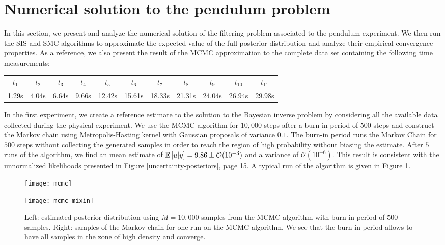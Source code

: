 \section{Numerical solution to the pendulum problem}
In this section, we present and analyze the numerical solution of the filtering problem associated to the pendulum experiment. We then run the SIS and SMC algorithms to approximate the expected value of the full posterior distribution and analyze their empirical convergence properties. As a reference, we also present the result of the MCMC approximation to the complete data set containing the following time measurements:

\begin{table}[h]
  \begin{center}
    \begin{tabular}{|c c c c c c c c c c c|}
      \hline $t_1$ & $t_2$ & $t_3$ & $t_4$ & $t_5$ & $t_6$ & $t_7$ & $t_8$ & $t_9$ & $t_{10}$ & $t_{11}$ \\
      \hline
      1.29s & 4.04s & 6.64s & 9.66s & 12.42s & 15.61s & 18.33s & 21.31s & 24.04s & 26.94s & 29.98s \\
      \hline
    \end{tabular}
  \end{center}
\end{table}

In the first experiment, we create a reference estimate to the solution to the Bayesian inverse problem by considering all the available data collected during the physical experiment. We use the MCMC algorithm for $10,000$ steps after a burn-in period of $500$ steps and construct the Markov chain using Metropolis-Hasting kernel with Gaussian proposals of variance $0.1$. The burn-in period runs the Markov Chain for $500$ steps without collecting the generated samples in order to reach the region of high probability without biasing the estimate. After $5$ runs of the algorithm, we find an mean estimate of $\mathbb{E}\left[u|y\right] = 9.86 \pm \mathcal{O}(10^{-3})$ and a variance of $\mathcal{O}(10^{-6})$. This result is consistent with the unnormalized likelihoods presented in Figure \ref{uncertainty-posteriors}, page 15. A typical run of the algorithm is given in Figure \ref{mcmc-figure}.

\begin{figure}[!t]
  \begin{minipage}{.43\textwidth}
    \texttt{[image: mcmc]}
  \end{minipage}
  \begin{minipage}{.5\textwidth}
    \texttt{[image: mcmc-mixin]}
  \end{minipage}
  \caption{Left: estimated posterior distribution using $M=10,000$ samples from the MCMC algorithm with burn-in period of $500$ samples. Right: samples of the Markov chain for one run on the MCMC algorithm. We see that the burn-in period allows to have all samples in the zone of high density and converge.}
  \label{mcmc-figure}
\end{figure}

